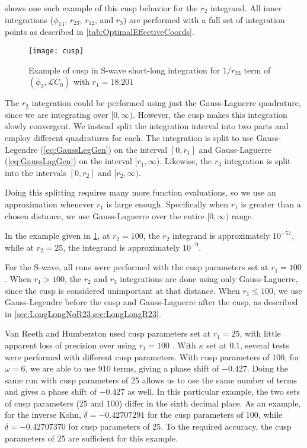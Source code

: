\documentclass[Dissertation.tex]{subfiles}
\begin{document}
 shows one such example of this cusp behavior for the $r_2$ 
integrand. All inner integrations ($\phi_{13}$, $r_{23}$, $r_{12}$, and $r_3$)
are performed with a full set of integration points as described in
\cref{tab:OptimalEffectiveCoords}.

\begin{figure}[H]
	\centering
	\texttt{[image: cusp]}
	\caption[Example of cusp in S-wave short-long integration]{Example of cusp
in S-wave short-long integration for $1/r_{23}$ term of
$(\bar{\phi}_3, \mathcal{L}\bar{C}_0)$ with \mbox{$r_1 = 18.201$}}
	\label{fig:cusp}
\end{figure}

The $r_2$ integration could be performed using just the Gauss-Laguerre 
quadrature, since we are integrating over $[0,\infty)$. However, the cusp 
makes this integration slowly convergent. We instead split the integration 
interval into two parts and employ different quadratures for each. The 
integration is split to use Gauss-Legendre (\cref{eq:GaussLegGen}) on the 
interval $[0,r_1]$ and Gauss-Laguerre (\cref{eq:GaussLagGen}) on the interval 
$[r_1,\infty)$. Likewise, the $r_3$ integration is split into the intervals
$[0,r_2]$ and $[r_2,\infty)$.

Doing this splitting requires many more function evaluations, so we use an 
approximation whenever $r_1$ is large enough. Specifically when $r_1$ is 
greater than a chosen distance, we use Gauss-Laguerre over the entire
$[0,\infty)$ range. 



In the example given in \cref{fig:cusp}, at $r_2 = 100$, the $r_2$ integrand 
is approximately $10^{-57}$, while at $r_2 = 25$, the integrand is 
approximately $10^{-9}$.


For the S-wave, all runs were performed with the cusp parameters set at
$r_1 = 100$. When $r_1 > 100$, the $r_2$ and $r_3$ integrations are done using only 
Gauss-Laguerre, since the cusp is considered unimportant at that distance. 
When $r_1 \leq 100$, we use Gauss-Legendre before the cusp and Gauss-Laguerre 
after the cusp, as described in \cref{sec:LongLongNoR23,sec:LongLongR23}. 

Van Reeth and Humberston used cusp parameters set at $r_1 = 25$, with little 
apparent loss of precision over using $r_1 = 100$ \cite{VanReethPrivate}. 
With $\kappa$ set at $0.1$, several tests were performed with different cusp 
parameters. With cusp parameters of 100, for $\omega = 6$, we are able to use 
910 terms, giving a phase shift of $-0.427$. Doing the same run with cusp 
parameters of 25 allows us to use the same number of terms and gives a phase 
shift of $-0.427$ as well. In this particular example, the two sets of cusp 
parameters (25 and 100) differ in the sixth decimal place. As an example, for 
the inverse Kohn, $\delta = -0.42707291$ for the cusp parameters of 100, 
while $\delta = -0.42707370$ for cusp parameters of 25. To the required 
accuracy, the cusp parameters of 25 are sufficient for this example.
\end{document}
